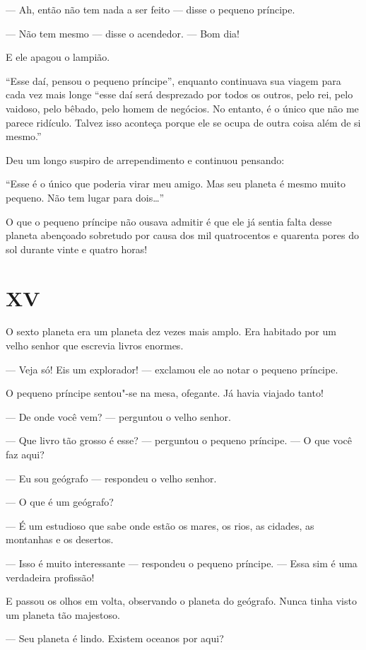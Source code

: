 \begin{Parallel}[p]{}{}
{--- Ah, então não tem nada a ser feito --- disse o pequeno príncipe.

--- Não tem mesmo --- disse o acendedor. --- Bom dia!

E ele apagou o lampião.

``Esse daí, pensou o pequeno príncipe'', enquanto continuava sua viagem
para cada vez mais longe ``esse daí será desprezado por todos os outros,
pelo rei, pelo vaidoso, pelo bêbado, pelo homem de negócios. No entanto,
é o único que não me parece ridículo. Talvez isso aconteça porque ele se
ocupa de outra coisa além de si mesmo.''

Deu um longo suspiro de arrependimento e continuou pensando:

``Esse é o único que poderia virar meu amigo. Mas seu planeta é mesmo
muito pequeno. Não tem lugar para dois\ldots{}''

O que o pequeno príncipe não ousava admitir é que ele já sentia falta
desse planeta abençoado sobretudo por causa dos mil quatrocentos e
quarenta pores do sol durante vinte e quatro horas!

\section{XV}

O sexto planeta era um planeta dez vezes mais amplo. Era habitado por um
velho senhor que escrevia livros enormes.

--- Veja só! Eis um explorador! --- exclamou ele ao notar o pequeno
príncipe.

O pequeno príncipe sentou"-se na mesa, ofegante. Já havia viajado tanto!

--- De onde você vem? --- perguntou o velho senhor.

--- Que livro tão grosso é esse? --- perguntou o pequeno príncipe. --- O que
você faz aqui?

--- Eu sou geógrafo --- respondeu o velho senhor.

--- O que é um geógrafo?

--- É um estudioso que sabe onde estão os mares, os rios, as cidades, as
montanhas e os desertos.

--- Isso é muito interessante --- respondeu o pequeno príncipe. --- Essa sim
é uma verdadeira profissão!

E passou os olhos em volta, observando o planeta do geógrafo. Nunca
tinha visto um planeta tão majestoso.

--- Seu planeta é lindo. Existem oceanos por aqui?

}
\end{Parallel}
